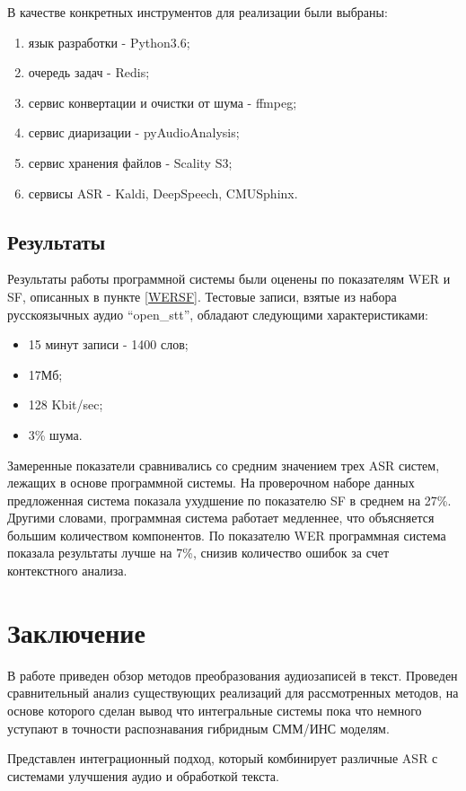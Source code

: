 \documentclass[conference]{IEEEtran}
\begin{document}
В качестве конкретных инструментов для реализации были выбраны:

\begin{enumerate}
\item язык разработки - Python3.6;
\item очередь задач - Redis;
\item сервис конвертации и очистки от шума - ffmpeg;
\item сервис диаризации - pyAudioAnalysis;
\item сервис хранения файлов - Scality S3;
\item сервисы ASR - Kaldi, DeepSpeech, CMUSphinx.
\end{enumerate}


\subsection{Результаты}
Результаты работы программной системы были оценены по показателям WER и SF, описанных в пункте \ref{WERSF}.
Тестовые записи, взятые из набора русскоязычных аудио “open_stt”, обладают следующими характеристиками:

\begin{itemize}
\item 15 минут записи - 1400 слов;
\item 17Мб;
\item 128 Kbit/sec;
\item 3\% шума.
\end{itemize}

Замеренные показатели сравнивались со средним значением трех ASR систем, лежащих в основе программной системы.
На проверочном наборе данных предложенная система показала ухудшение по показателю SF в среднем на 27\%.
Другими словами, программная система работает медленнее, что объясняется большим количеством компонентов.
По показателю WER программная система показала результаты лучше на 7\%, снизив количество ошибок за счет контекстного анализа.

\section{Заключение}
В работе приведен обзор методов преобразования аудиозаписей в текст. Проведен сравнительный анализ существующих реализаций для рассмотренных методов, на основе которого сделан вывод что интегральные системы пока что немного уступают в точности распознавания гибридным СММ/ИНС моделям.

Представлен интеграционный подход, который комбинирует различные ASR с системами улучшения аудио и обработкой текста.
\end{document}
